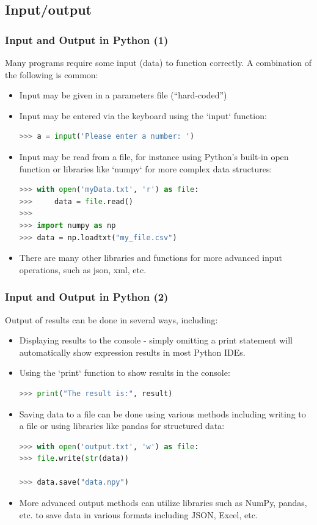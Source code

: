 \subsection{Input/output}
\begin{frame}[fragile]
  \frametitle{Input and Output in Python (1)}
  Many programs require some input (data) to function correctly. A combination of the following is common:
  \begin{itemize}[<+->]
    \item Input may be given in a parameters file (``hard-coded'')
    \item Input may be entered via the keyboard using the `input` function:
    \begin{lstlisting}[language=Python,numbers=none]
>>> a = input('Please enter a number: ')
    \end{lstlisting}
    \item Input may be read from a file, for instance using Python's built-in open function or libraries like `numpy` for more complex data structures:
    \begin{lstlisting}[language=Python,numbers=none]
>>> with open('myData.txt', 'r') as file:
>>>     data = file.read()
>>> 
>>> import numpy as np
>>> data = np.loadtxt("my_file.csv")
    \end{lstlisting}
    \item There are many other libraries and functions for more advanced input operations, such as json, xml, etc.
  \end{itemize}
 \end{frame}

 \begin{frame}[fragile]
  \frametitle{Input and Output in Python (2)}
  Output of results can be done in several ways, including:
  \begin{itemize}[<+->]
    \item Displaying results to the console - simply omitting a print statement will automatically show expression results in most Python IDEs.
    \item Using the `print` function to show results in the console:
    \begin{lstlisting}[language=Python,numbers=none]
>>> print("The result is:", result)
    \end{lstlisting}
    \item Saving data to a file can be done using various methods including writing to a file or using libraries like pandas for structured data:
    \begin{lstlisting}[language=Python,numbers=none]
>>> with open('output.txt', 'w') as file:
>>> file.write(str(data))

>>> data.save("data.npy")
    \end{lstlisting}
    \item More advanced output methods can utilize libraries such as NumPy, pandas, etc. to save data in various formats including JSON, Excel, etc.
  \end{itemize}
 \end{frame}



